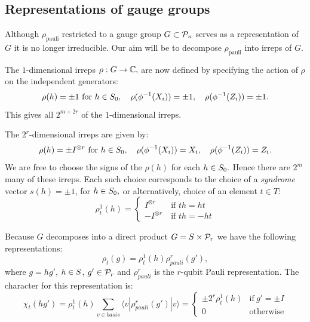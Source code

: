 \documentclass[12pt]{article}
\begin{document}
\subsection{Representations of gauge groups}

Although $\rho_{\mathrm{pauli}}$
restricted to a gauge group $G\subset\mathcal{P}_n$ serves as a representation
of $G$ it is no longer irreducible.
Our aim will be to decompose $\rho_{\mathrm{pauli}}$ into irreps of $G.$

The $1$-dimensional irreps $\rho:G\to \mathbb{C},$
are now defined by
specifying the action of $\rho$ on the independent generators:
$$
    \rho(h)=\pm 1\ \mbox{for}\ h\in S_0,
    \quad \rho(\phi^{-1}(X_i)) = \pm 1,\quad \rho(\phi^{-1}(Z_i)) = \pm 1.
$$
This gives all $2^{m+2r}$ of the $1$-dimensional irreps.

The $2^r$-dimensional irreps are given by:
$$
    \rho(h) = \pm I^{\otimes r}\ \mbox{for}\ h\in S_0,
    \quad \rho(\phi^{-1}(X_i)) = X_i,\quad \rho(\phi^{-1}(Z_i)) = Z_i.
$$
We are free to choose the signs of the $\rho(h)$ for each $h\in S_0.$
Hence there are $2^m$ many of these irreps.
Each such choice corresponds to the choice of a {\it syndrome} vector $s(h)=\pm 1$, for $h \in S_0,$
or alternatively, choice of an element $t\in T:$
$$
    \rho^1_t(h) = \left\{ \begin{array}{ll}
 I^{\otimes r}\ &\mbox{if $th=ht$}\\
 -I^{\otimes r}\ &\mbox{if $th=-ht$}\end{array} \right. %
$$


Because $G$ decomposes 
into a direct product $G=S\times \mathcal{P}_r$ we have the
following representations:
$$
    \rho_t(g) = \rho^1_t(h) \rho^r_{pauli}(g'),
$$
where $g=hg'$, $h\in S$, $g'\in \mathcal{P}_r$ 
and $\rho^r_{pauli}$ is the $r$-qubit Pauli representation.
The character for this representation is:
$$
\chi_{t}(hg') = \rho_t^1(h) \sum_{v \in basis} \langle v | \rho^r_{{pauli}}(g') | v \rangle
    = \left\{ \begin{array}{ll}
 \pm 2^r\rho_t^1(h) &\mbox{if}\ g'=\pm I\\
 0 &\mbox{otherwise}\end{array}\right.
$$
\end{document}
